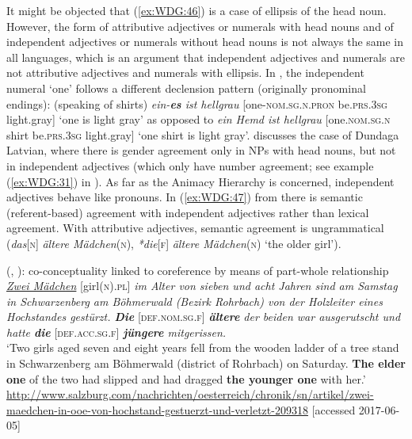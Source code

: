 \documentclass[output=collectionpaper]{langsci/langscibook}
\begin{document}
\newpage 
It might be objected that (\ref{ex:WDG:46}) is a case of ellipsis of the head noun. However, the form of attributive adjectives or numerals with head nouns and of independent adjectives or numerals without head nouns is not always the same in all languages, which is an argument that independent adjectives and numerals are not attributive adjectives and numerals with ellipsis. In , the independent numeral `one' follows a different declension pattern (originally pronominal endings): (speaking of shirts) \textit{ein-\textbf{es} ist hellgrau} [one-\textsc{nom.sg.n.pron} be.\textsc{prs.3sg} light.gray] `one is light gray' as opposed to \textit{ein Hemd ist hellgrau} [one.\textsc{nom.sg.n} shirt be.\textsc{prs.3sg} light.gray] `one shirt is light gray'. \cite{Waelchli2017} discusses the case of Dundaga Latvian, where there is gender agreement only in NPs with head nouns, but not in independent adjectives (which only have number agreement; see example (\ref{ex:WDG:31}) in ). As far as the Animacy Hierarchy is concerned, independent adjectives behave like pronouns. In (\ref{ex:WDG:47}) from  there is semantic (referent-based) agreement with independent adjectives rather than lexical agreement. With attributive adjectives, semantic agreement is ungrammatical (\textit{das}[\textsc{n}] \textit{ältere Mädchen}(\textsc{n}), \textit{*die}[\textsc{f}] \textit{ältere Mädchen}(\textsc{n}) `the older girl').

\ea\label{ex:WDG:47}
 (, ): co-conceptuality linked to coreference by means of part-whole relationship\\
\textit{\uline{Zwei Mädchen}} [girl\textsc{(n).pl}] \textit{im Alter von sieben und acht Jahren sind am Samstag in Schwarzenberg am Böhmerwald (Bezirk Rohrbach) von der Holzleiter eines Hochstandes gestürzt. \textbf{Die}} [\textsc{def.nom.sg.f}] \textit{\textbf{ältere} der beiden war ausgerutscht und hatte \textbf{die}} [\textsc{def.acc.sg.f}] \textit{\textbf{jüngere} mitgerissen.}\\
	`Two girls aged seven and eight years fell from the wooden ladder of a tree stand in Schwarzenberg am Böhmerwald (district of Rohrbach) on Saturday. \textbf{The elder one} of the two had slipped and had dragged \textbf{the younger one} with her.' \url{http://www.salzburg.com/nachrichten/oesterreich/chronik/sn/artikel/zwei-maedchen-in-ooe-von-hochstand-gestuerzt-und-verletzt-209318} [accessed 2017-06-05]\\
  \z
\end{document}
